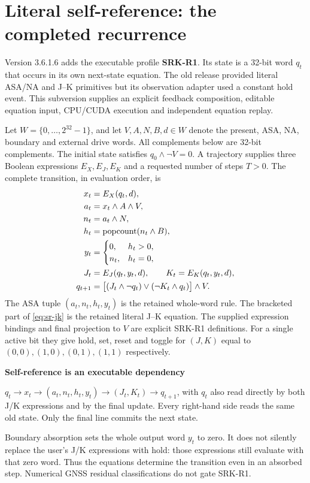 \section{Literal self-reference: the completed recurrence}
\label{sec:selfref}
Version 3.6.1.6 adds the executable profile \textbf{SRK-R1}. Its state is a
32-bit word $q_t$ that occurs in its own next-state equation. The old release
provided literal ASA/NA and J--K primitives but its observation adapter used a
constant hold event. This subversion supplies an explicit feedback composition,
editable equation input, CPU/CUDA execution and independent equation replay.

Let $W=\{0,\ldots,2^{32}-1\}$, and let $V,A,N,B,d\in W$ denote the present,
ASA, NA, boundary and external drive words. All complements below are 32-bit
complements. The initial state satisfies $q_0\land\neg V=0$. A trajectory supplies
three Boolean expressions $E_X,E_J,E_K$ and a requested number of steps $T>0$.
The complete transition, in evaluation order, is
\begin{align}
x_t &= E_X(q_t,d),\label{eq:sr-x}\\
a_t &= x_t\land A\land V,\\
n_t &= a_t\land N,\\
h_t &= \operatorname{popcount}(n_t\land B),\\
y_t &= \begin{cases}0,&h_t>0,\\ n_t,&h_t=0,\end{cases}\label{eq:sr-asa}\\
J_t &= E_J(q_t,y_t,d),\qquad K_t=E_K(q_t,y_t,d),\\
q_{t+1} &= \big[(J_t\land\neg q_t)\lor(\neg K_t\land q_t)\big]\land V.
\label{eq:sr-jk}
\end{align}
The ASA tuple $(a_t,n_t,h_t,y_t)$ is the retained whole-word rule. The bracketed
part of \eqref{eq:sr-jk} is the retained literal J--K equation. The supplied
expression bindings and final projection to $V$ are explicit SRK-R1 definitions.
For a single active bit they give hold, set, reset and toggle for $(J,K)$ equal
to $(0,0),(1,0),(0,1),(1,1)$ respectively.

\begin{panel}
\textbf{Self-reference is an executable dependency}\par
$q_t\longrightarrow x_t\longrightarrow(a_t,n_t,h_t,y_t)
\longrightarrow(J_t,K_t)\longrightarrow q_{t+1}$, with $q_t$ also read directly
by both J/K expressions and by the final update. Every right-hand side reads the
same old state. Only the final line commits the next state.
\end{panel}
Boundary absorption sets the whole output word $y_t$ to zero. It does not
silently replace the user's J/K expressions with hold: those expressions still
evaluate with that zero word. Thus the equations determine the transition even
in an absorbed step. Numerical GNSS residual classifications do not gate SRK-R1.
\clearpage

